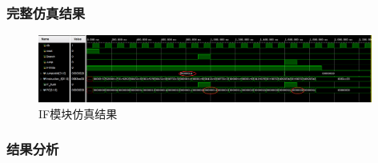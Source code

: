 \documentclass{../source/zjureport}
\begin{document}
            \subsubsection{完整仿真结果}
            \begin{figure}[H]
                \centering
                \includegraphics[width = 0.98\textwidth]{figure/IF.png}
                \caption{IF模块仿真结果}
            \end{figure}

            \subsubsection{结果分析}
\end{document}

